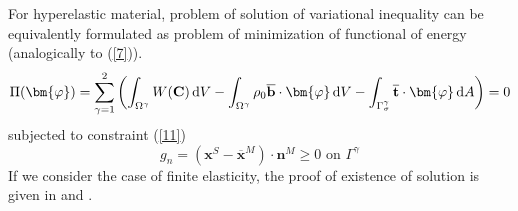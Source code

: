 \documentclass{article}
\newcommand{\beq}{\begin{equation}}
\newcommand{\eeq}{\end{equation}}
\newcommand{\dd}{\,{\rm d}}
\begin{document}
\\
\\
For hyperelastic material, problem of solution of variational inequality can be equivalently formulated \cite[Chapter 5, p.98]{Wriggers} as problem of minimization of functional of energy (analogically to (\ref{7})).
\begin{equation}\label{19}
\Pi(\bm{\varphi}) = \sum^{2}_{\gamma = 1}\left(\int_{\Omega^{\gamma}} W(\mathbf{C})\dd V-\int_{\Omega^{\gamma}} \rho_{0}\overline{\mathbf{b}} \cdot \mathbf{\bm{\varphi}} \dd V-\int_{\Gamma_{\sigma}^{\gamma}} \overline{\mathbf{t}} \cdot \mathbf{\bm{\varphi}} \dd A\right)=0
\end{equation}
subjected to constraint (\ref{11})
\beq
g_{n}=\left(\mathbf{x}^{S}-\overline{\mathbf{x}}^{M}\right) \cdot \mathbf{n}^{M} \geq 0 \text{ on } \Gamma^{\gamma} 
\nonumber
\eeq
If we consider the case of finite elasticity, the proof of existence of solution is given in \cite{Ciarlet} and \cite{Curnier}.
\end{document}
